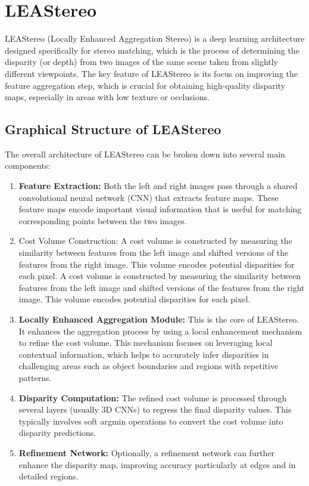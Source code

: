 \documentclass[22pt]{report}
\begin{document}
\section{LEAStereo}
LEAStereo (Locally Enhanced Aggregation Stereo) is a deep learning architecture designed specifically for stereo matching, which is the process of determining the disparity (or depth) from two images of the same scene taken from slightly different viewpoints. The key feature of LEAStereo is its focus on improving the feature aggregation step, which is crucial for obtaining high-quality disparity maps, especially in areas with low texture or occlusions.\\
\vspace{8}
\subsection{Graphical Structure of LEAStereo}
The overall architecture of LEAStereo can be broken down into several main components:
\begin{enumerate}
    \item \textbf{Feature Extraction:} Both the left and right images pass through a shared convolutional neural network (CNN) that extracts feature maps. These feature maps encode important visual information that is useful for matching corresponding points between the two images.
    \item Cost Volume Construction: A cost volume is constructed by measuring the similarity between features from the left image and shifted versions of the features from the right image. This volume encodes potential disparities for each pixel. A cost volume is constructed by measuring the similarity between features from the left image and shifted versions of the features from the right image. This volume encodes potential disparities for each pixel.
    \item \textbf{Locally Enhanced Aggregation Module:} This is the core of LEAStereo. It enhances the aggregation process by using a local enhancement mechanism to refine the cost volume. This mechanism focuses on leveraging local contextual information, which helps to accurately infer disparities in challenging areas such as object boundaries and regions with repetitive patterns.
    \item \textbf{Disparity Computation:} The refined cost volume is processed through several layers (usually 3D CNNs) to regress the final disparity values. This typically involves soft argmin operations to convert the cost volume into disparity predictions.
    \item \textbf{Refinement Network:} Optionally, a refinement network can further enhance the disparity map, improving accuracy particularly at edges and in detailed regions.
\end{enumerate}
\vspace{20}
\end{document}

